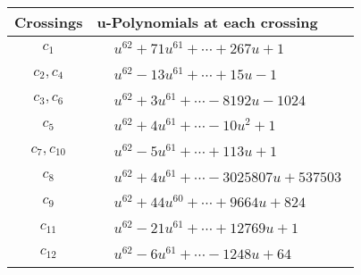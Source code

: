 \documentclass[1p]{elsarticle_modified}
\theoremstyle{definition}
\begin{document}
\begin{tabular}{m{50pt}|m{274pt}}
Crossings & \hspace{64pt}u-Polynomials at each crossing \\
\hline $$\begin{aligned}c_{1}\end{aligned}$$&$\begin{aligned}
&u^{62}+71 u^{61}+\cdots+267 u+1
\end{aligned}$\\
\hline $$\begin{aligned}c_{2},c_{4}\end{aligned}$$&$\begin{aligned}
&u^{62}-13 u^{61}+\cdots+15 u-1
\end{aligned}$\\
\hline $$\begin{aligned}c_{3},c_{6}\end{aligned}$$&$\begin{aligned}
&u^{62}+3 u^{61}+\cdots-8192 u-1024
\end{aligned}$\\
\hline $$\begin{aligned}c_{5}\end{aligned}$$&$\begin{aligned}
&u^{62}+4 u^{61}+\cdots-10 u^2+1
\end{aligned}$\\
\hline $$\begin{aligned}c_{7},c_{10}\end{aligned}$$&$\begin{aligned}
&u^{62}-5 u^{61}+\cdots+113 u+1
\end{aligned}$\\
\hline $$\begin{aligned}c_{8}\end{aligned}$$&$\begin{aligned}
&u^{62}+4 u^{61}+\cdots-3025807 u+537503
\end{aligned}$\\
\hline $$\begin{aligned}c_{9}\end{aligned}$$&$\begin{aligned}
&u^{62}+44 u^{60}+\cdots+9664 u+824
\end{aligned}$\\
\hline $$\begin{aligned}c_{11}\end{aligned}$$&$\begin{aligned}
&u^{62}-21 u^{61}+\cdots+12769 u+1
\end{aligned}$\\
\hline $$\begin{aligned}c_{12}\end{aligned}$$&$\begin{aligned}
&u^{62}-6 u^{61}+\cdots-1248 u+64
\end{aligned}$\\
\hline
\end{tabular}\\~\\
\end{document}
